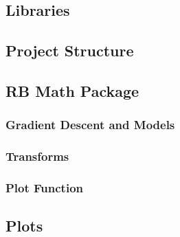 \documentclass{report}
\begin{document}
        \subsection{Libraries}
        \subsection{Project Structure}
        \subsection{RB Math Package}
            \subsubsection{Gradient Descent and Models}
            \subsubsection{Transforms}
            \subsubsection{Plot Function}
        \subsection{Plots}
\end{document}
